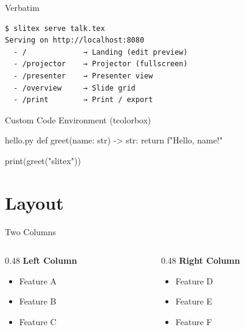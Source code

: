 \documentclass[aspectratio=169]{beamer}
\begin{document}
\begin{frame}[fragile]{Verbatim}
  \begin{verbatim}
$ slitex serve talk.tex
Serving on http://localhost:8080
  - /             → Landing (edit preview)
  - /projector    → Projector (fullscreen)
  - /presenter    → Presenter view
  - /overview     → Slide grid
  - /print        → Print / export
  \end{verbatim}
\end{frame}

\begin{frame}[fragile]{Custom Code Environment (tcolorbox)}
  \begin{pycode}{hello.py}
def greet(name: str) -> str:
    return f"Hello, {name}!"

print(greet("slitex"))
  \end{pycode}
\end{frame}

\section{Layout}

\begin{frame}{Two Columns}
  \begin{columns}
    \begin{column}{0.48\textwidth}
      \textbf{Left Column}
      \begin{itemize}
        \item Feature A
        \item Feature B
        \item Feature C
      \end{itemize}
    \end{column}
    \begin{column}{0.48\textwidth}
      \textbf{Right Column}
      \begin{itemize}
        \item Feature D
        \item Feature E
        \item Feature F
      \end{itemize}
    \end{column}
  \end{columns}
\end{frame}
\end{document}
